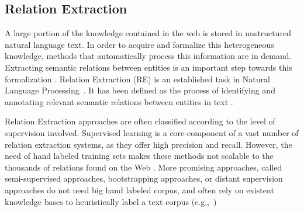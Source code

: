 \subsection{Relation Extraction}
\label{sec:SOA:nlu:relation_extraction}



A large portion of the knowledge contained in the web is stored in unstructured natural language text. In order to acquire and formalize this heterogeneous knowledge, methods that automatically process this information are in demand. Extracting semantic relations between entities is an important step towards this formalization \citep{Wang2008}. Relation Extraction (RE) is an established task in Natural Language Processing~\citep{Bach2007}. It has been defined as the process of identifying and annotating relevant semantic relations between entities in text \citep{JiangZhai2007}. 

Relation Extraction approaches are often classified according to the level of supervision involved.
Supervised learning is a core-component of a vast number of relation extraction systems, as they offer high precision and recall. However, the need of hand labeled training sets makes these methods not scalable to the thousands of relations found on the Web \citep{Hoffmann2011}.
More promising approaches, called semi-supervised approaches, bootstrapping approaches, or distant supervision approaches do not need big hand labeled corpus, and
often rely on existent knowledge bases to heuristically label a text corpus (e.g.,~\citep{Carlson2010,Hoffmann2011})

